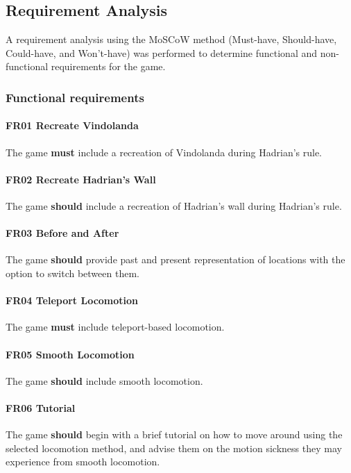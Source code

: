 \documentclass[sigconf,authordraft]{acmart}
\begin{document}
\subsection{Requirement Analysis}

A requirement analysis using the MoSCoW method (Must-have, Should-have,
Could-have, and Won't-have) was performed to determine functional and
non-functional requirements for the game.

\subsubsection{Functional requirements}

\paragraph{FR01 Recreate Vindolanda}
The game \textbf{must} include a recreation of Vindolanda during Hadrian's
rule.

\paragraph{FR02 Recreate Hadrian's Wall}
The game \textbf{should} include a recreation of Hadrian's wall during Hadrian's
rule.

\paragraph{FR03 Before and After}
The game \textbf{should} provide past and present representation of locations
with the option to switch between them.

\paragraph{FR04 Teleport Locomotion}
The game \textbf{must} include teleport-based locomotion.

\paragraph{FR05 Smooth Locomotion}
The game \textbf{should} include smooth locomotion.

\paragraph{FR06 Tutorial}
The game \textbf{should} begin with a brief tutorial on how to move around
using the selected locomotion method, and advise them on the motion sickness
they may experience from smooth locomotion.
\end{document}
